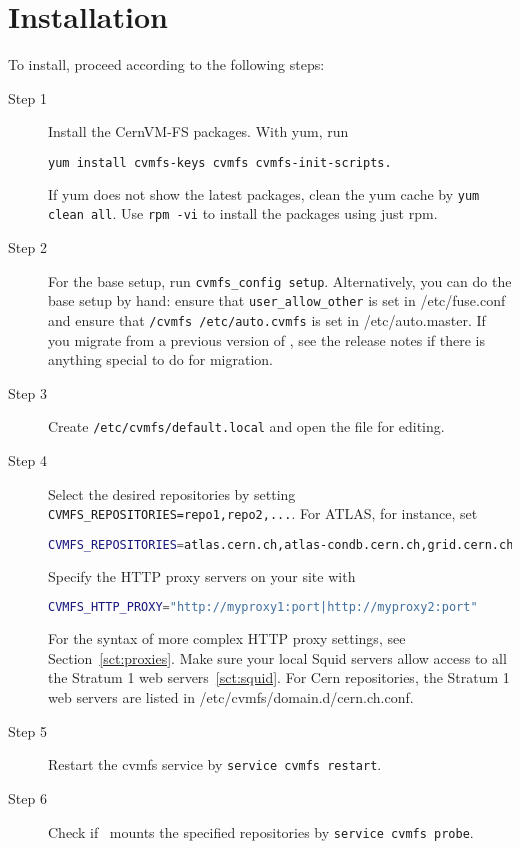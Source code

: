 \section{Installation}
To install, proceed according to the following steps:
\begin{description}
	\item[Step 1] Install the CernVM-FS packages.  With yum, run 
					\begin{lstlisting}[language=bash]
yum install cvmfs-keys cvmfs cvmfs-init-scripts.
					\end{lstlisting}
			      If yum does not show the latest packages, clean the yum cache by \lstinline{yum clean all}.
			      Use \lstinline{rpm -vi} to install the packages using just rpm.
    \item[Step 2] For the base setup, run \lstinline{cvmfs_config setup}.
    				Alternatively, you can do the base setup by hand: ensure that \texttt{user\_allow\_other} is set in /etc/fuse.conf and ensure that \texttt{/cvmfs /etc/auto.cvmfs} is set in /etc/auto.master.
					If you migrate from a previous version of \cvmfs, see the release notes if there is anything special to do for migration.
	\item[Step 3] Create \texttt{/etc/cvmfs/default.local} and open the file for editing.
	\item[Step 4] Select the desired repositories by setting \lstinline{CVMFS_REPOSITORIES=repo1,repo2,...}.
		For ATLAS, for instance, set 
		\begin{lstlisting}[language=bash]
CVMFS_REPOSITORIES=atlas.cern.ch,atlas-condb.cern.ch,grid.cern.ch
		\end{lstlisting}
		Specify the HTTP proxy servers on your site with
		\begin{lstlisting}[language=bash]
CVMFS_HTTP_PROXY="http://myproxy1:port|http://myproxy2:port"
		\end{lstlisting}
		For the syntax of more complex HTTP proxy settings, see Section~\ref{sct:proxies}.
		Make sure your local Squid servers allow access to all the Stratum 1 web servers~\ref{sct:squid}.
		For Cern repositories, the Stratum 1 web servers are listed in /etc/cvmfs/domain.d/cern.ch.conf.
	\item[Step 5] Restart the cvmfs service by \lstinline{service cvmfs restart}.
	\item[Step 6] Check if \cvmfs\ mounts the specified repositories by \lstinline{service cvmfs probe}.
\end{description}

